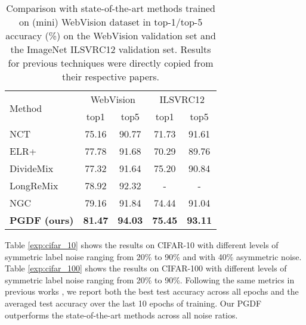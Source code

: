 \documentclass[letterpaper]{article} \usepackage{aaai22}  \usepackage{times}  \usepackage{helvet}  \usepackage{courier}  \usepackage[hyphens]{url}  \usepackage{graphicx} \urlstyle{rm} \def\UrlFont{\rm}  \usepackage{natbib}  \usepackage{caption} \DeclareCaptionStyle{ruled}{labelfont=normalfont,labelsep=colon,strut=off} \frenchspacing  \setlength{\pdfpagewidth}{8.5in}  \setlength{\pdfpageheight}{11in}  \usepackage{algorithm}
\begin{document}
\begin{table}[]
\caption{Comparison with state-of-the-art methods trained on (mini) WebVision dataset in top-1/top-5 accuracy (\%) on the WebVision validation set and the ImageNet ILSVRC12 validation set. Results for previous techniques were directly copied from their respective papers.}
\vskip 0.15in
\scriptsize
\centering
\begin{tabular}{@{}l|cc|cc@{}}
\toprule
\multicolumn{1}{l|}{\multirow{2}{*}{Method}} & \multicolumn{2}{c|}{WebVision}                        & \multicolumn{2}{c}{ILSVRC12}               \\ \cmidrule(l){2-5} 
\multicolumn{1}{l|}{}                        & \multicolumn{1}{c}{top1} & \multicolumn{1}{c|}{top5} & \multicolumn{1}{c}{top1} & top5           \\ \midrule
NCT \cite{2020Noisy}                                         & 75.16                     & 90.77                     & 71.73                     & 91.61          \\
ELR+ \cite{2020Early}                                        & 77.78                     & 91.68                     & 70.29                     & 89.76          \\
DivideMix \cite{2020DivideMix}                                   & 77.32                     & 91.64                     & 75.20                     & 90.84          \\
LongReMix \cite{2021LongReMix}                                   & 78.92                     & 92.32                     & -                         & -              \\
NGC \cite{wu2021ngc}                                         & 79.16                     & 91.84                     & 74.44                     & 91.04          \\ \midrule
\textbf{PGDF (ours)}                         & \textbf{81.47}            & \textbf{94.03}            & \textbf{75.45}            & \textbf{93.11} \\ \bottomrule
\end{tabular}
\label{exp:webvision}
\vskip -0.1in
\end{table}




Table \ref{exp:cifar_10} shows the results on CIFAR-10 with different levels of symmetric label noise ranging from 20\% to 90\% and with 40\% asymmetric noise. Table \ref{exp:cifar_100} shows the results on CIFAR-100 with different levels of symmetric label noise ranging from 20\% to 90\%. {Following the same metrics in previous works \cite{2021Augmentation,2021LongReMix,2020DivideMix,2020Early},} we report both the best test accuracy across all epochs and the averaged test accuracy over the last 10 epochs of training. Our PGDF outperforms the state-of-the-art methods across all noise ratios.
\end{document}
